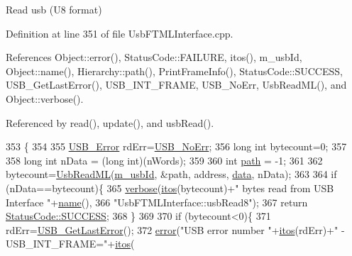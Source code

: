 Read usb (U8 format) 

Definition at line 351 of file Usb\+F\+T\+M\+L\+Interface.\+cpp.



References Object\+::error(), Status\+Code\+::\+F\+A\+I\+L\+U\+RE, itos(), m\+\_\+usb\+Id, Object\+::name(), Hierarchy\+::path(), Print\+Frame\+Info(), Status\+Code\+::\+S\+U\+C\+C\+E\+SS, U\+S\+B\+\_\+\+Get\+Last\+Error(), U\+S\+B\+\_\+\+I\+N\+T\+\_\+\+F\+R\+A\+ME, U\+S\+B\+\_\+\+No\+Err, Usb\+Read\+M\+L(), and Object\+::verbose().



Referenced by read(), update(), and usb\+Read().


\begin{DoxyCode}
353                                                              \{
354   
355   \hyperlink{LALUsbML_8h_aa7e5a2302774d5aa1d48a2a1cfc46e86}{USB\_Error} rdErr=\hyperlink{LALUsbML_8h_ab44759ae95dd86cbc2855adf525c43cd}{USB\_NoErr};
356   \textcolor{keywordtype}{long} \textcolor{keywordtype}{int} bytecount=0;
357 
358   \textcolor{keywordtype}{long} \textcolor{keywordtype}{int} nData = (\textcolor{keywordtype}{long} int)(nWords);
359 
360   \textcolor{keywordtype}{int} \hyperlink{classHierarchy_aa7990fa7caf132d83e361ce033c6c65a}{path} = -1;
361   
362   bytecount=\hyperlink{LALUsbML_8h_a540320392908ba7d57bcc168916a82d4}{UsbReadML}(\hyperlink{classUsbFTMLInterface_aab6754587c303660d5c498ce34a2b4c8}{m\_usbId}, &path, address, \hyperlink{namespaceshell_a5ea2525995cedc3efd69ea8a7f034d1e}{data}, nData);
363 
364   \textcolor{keywordflow}{if} (nData==bytecount)\{
365     \hyperlink{classObject_a83d2db2df682907ea1115ad721c1c4a1}{verbose}(\hyperlink{Tools_8h_af330027dbdafb9a30768b3613c553e60}{itos}(bytecount)+\textcolor{stringliteral}{" bytes read from USB Interface "}+\hyperlink{classObject_a300f4c05dd468c7bb8b3c968868443c1}{name}(),
366             \textcolor{stringliteral}{"UsbFTMLInterface::usbRead8"});
367     \textcolor{keywordflow}{return} \hyperlink{classStatusCode_a6f565cbeadc76d14c72f047e5e85eb4badd0da38d3ba0d922efd1f4619bc37ad8}{StatusCode::SUCCESS};
368   \}
369 
370   \textcolor{keywordflow}{if} (bytecount<0)\{
371     rdErr=\hyperlink{LALUsbML_8h_a1662b77c9968848acf173f6f9c765ddd}{USB\_GetLastError}();
372     \hyperlink{classObject_a204a95f57818c0f811933917a30eff45}{error}(\textcolor{stringliteral}{"USB error number "}+\hyperlink{Tools_8h_af330027dbdafb9a30768b3613c553e60}{itos}(rdErr)+\textcolor{stringliteral}{" - USB\_INT\_FRAME="}+\hyperlink{Tools_8h_af330027dbdafb9a30768b3613c553e60}{itos}(

\end{DoxyCode}

